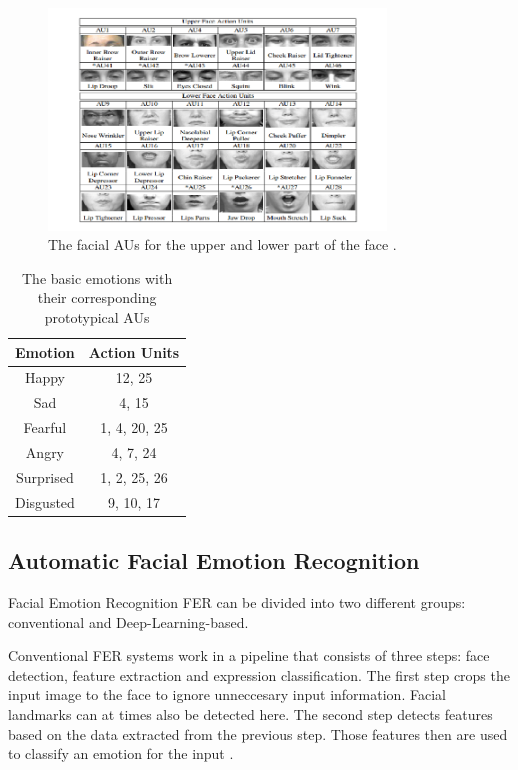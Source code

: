 \begin{figure}
    \centering
    \includegraphics[width=0.8\textwidth]{res/Facial-action-units-for-upper-and-lower-part-of-the-face-10.png}
    \caption{The facial AUs for the upper and lower part of the face \cite{soysal2018au}.}
    \label{fig:facs}
\end{figure}

\begin{table}
    \centering
    \begin{tabular}{c|c}
       \textbf{Emotion}  & \textbf{Action Units} \\ \hline
        Happy & 12, 25 \\
        Sad & 4, 15 \\
        Fearful & 1, 4, 20, 25 \\
        Angry & 4, 7, 24 \\
        Surprised & 1, 2, 25, 26 \\
        Disgusted & 9, 10, 17
    \end{tabular}
    \caption{The basic emotions with their corresponding prototypical AUs \cite{fabian2016emotionet}}
    \label{tab:emotionAUs}
\end{table}

\subsection{Automatic Facial Emotion Recognition}
Facial Emotion Recognition FER can be divided into two different groups: conventional and Deep-Learning-based. \cite{ko2018brief}

Conventional FER systems work in a pipeline that consists of three steps: face detection, feature extraction and expression classification. The first step crops the input image to the face to ignore unneccesary input information. Facial landmarks can at times also be detected here. The second step detects features based on the data extracted from the previous step. Those features then are used to classify an emotion for the input \cite{ko2018brief}.

